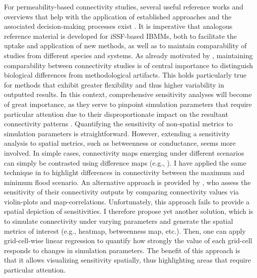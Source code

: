 \documentclass[../FinalThesis.tex]{subfiles}
\begin{document}
For permeability-based connectivity studies, several useful reference works and
overviews that help with the application of established approaches and the
associated decision-making processes exist \citep{Beier.2008, Beier.2011,
Zeller.2012, Etherington.2016, Zeller.2018, Diniz.2019, Hilty.2020}. It is
imperative that analogous reference material is developed for iSSF-based IBMMs,
both to facilitate the uptake and application of new methods, as well as to
maintain comparability of studies from different species and systems. As already
motivated by \citet{Finerty.2023}, maintaining comparability between
connectivity studies is of central importance to distinguish biological
differences from methodological artifacts. This holds particularly true for
methods that exhibit greater flexibility and thus higher variability in
outputted results. In this context, comprehensive sensitivity analyses will
become of great importance, as they serve to pinpoint simulation parameters that
require particular attention due to their disproportionate impact on the
resultant connectivity patterns \citep{Kanagaraj.2013}. Quantifying the
sensitivity of non-spatial metrics to simulation parameters is straightforward.
However, extending a sensitivity analysis to spatial metrics, such as
betweenness or conductance, seems more involved. In simple cases, connectivity
maps emerging under different scenarios can simply be contrasted using
difference maps (e.g., \citealp{Day.2020}). I have applied the same technique in
 to highlight differences in connectivity between the maximum
and minimum flood scenario. An alternative approach is provided by
\citet{Marrec.2020}, who assess the sensitivity of their connectivity outputs by
comparing connectivity values via violin-plots and map-correlations.
Unfortunately, this approach fails to provide a spatial depiction of
sensitivities. I therefore propose yet another solution, which is to simulate
connectivity under varying parameters and generate the spatial metrics of
interest (e.g., heatmap, betweenness map, etc.). Then, one can apply
grid-cell-wise linear regression to quantify how strongly the value of each
grid-cell responds to changes in simulation parameters. The benefit of this
approach is that it allows visualizing sensitivity spatially, thus highlighting
areas that require particular attention.
\end{document}
